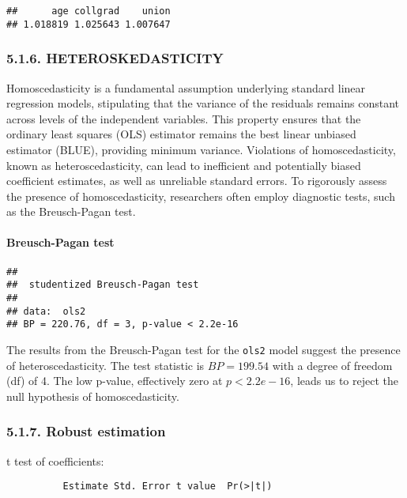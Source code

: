 \documentclass[
]{article}
\begin{document}
\begin{verbatim}
##      age collgrad    union 
## 1.018819 1.025643 1.007647
\end{verbatim}

\hypertarget{heteroskedasticity}{%
\subsubsection{5.1.6. HETEROSKEDASTICITY}\label{heteroskedasticity}}

Homoscedasticity is a fundamental assumption underlying standard linear
regression models, stipulating that the variance of the residuals
remains constant across levels of the independent variables. This
property ensures that the ordinary least squares (OLS) estimator remains
the best linear unbiased estimator (BLUE), providing minimum variance.
Violations of homoscedasticity, known as heteroscedasticity, can lead to
inefficient and potentially biased coefficient estimates, as well as
unreliable standard errors. To rigorously assess the presence of
homoscedasticity, researchers often employ diagnostic tests, such as the
Breusch-Pagan test.

\hypertarget{breusch-pagan-test}{%
\paragraph{Breusch-Pagan test}\label{breusch-pagan-test}}

\begin{verbatim}
## 
##  studentized Breusch-Pagan test
## 
## data:  ols2
## BP = 220.76, df = 3, p-value < 2.2e-16
\end{verbatim}

The results from the Breusch-Pagan test for the \texttt{ols2} model
suggest the presence of heteroscedasticity. The test statistic is
\(BP = 199.54\) with a degree of freedom (df) of 4. The low p-value,
effectively zero at \(p < 2.2e-16\), leads us to reject the null
hypothesis of homoscedasticity.

\hypertarget{robust-estimation}{%
\subsubsection{5.1.7. Robust estimation}\label{robust-estimation}}

t test of coefficients:

\begin{verbatim}
          Estimate Std. Error t value  Pr(>|t|)    
\end{verbatim}
\end{document}
